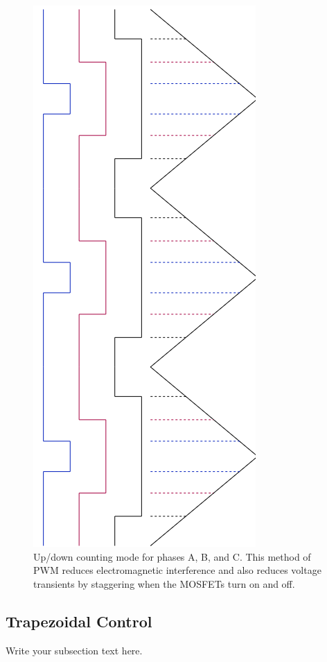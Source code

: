 \documentclass{article}
\begin{document}
	
		\begin{figure}[!h]
			\begin{center}
				\includegraphics[scale=0.5, angle=90]{UpDownCountingMode}
			\end{center}
			\caption{Up/down counting mode for phases A, B, and C.  This method of PWM reduces electromagnetic interference and also reduces voltage transients by staggering when the MOSFETs turn on and off.}
			\label{fig:UpDownCountingMode}
		\end{figure}
	
		\subsection{Trapezoidal Control}
		Write your subsection text here.
		
\end{document}
